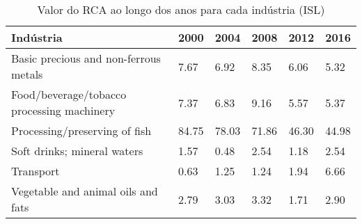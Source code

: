 \begin{table}
\centering
\caption{Valor do RCA ao longo dos anos para cada indústria (ISL)}
\begin{tabular}{p{6cm}p{1.5cm}p{1.5cm}p{1.5cm}p{1.5cm}p{1.5cm}}
\toprule
                                 Indústria &  2000 &  2004 &  2008 &  2012 &  2016 \\
\midrule
     Basic precious and non-ferrous metals &  7.67 &  6.92 &  8.35 &  6.06 &  5.32 \\
Food/beverage/tobacco processing machinery &  7.37 &  6.83 &  9.16 &  5.57 &  5.37 \\
             Processing/preserving of fish & 84.75 & 78.03 & 71.86 & 46.30 & 44.98 \\
               Soft drinks; mineral waters &  1.57 &  0.48 &  2.54 &  1.18 &  2.54 \\
                                 Transport &  0.63 &  1.25 &  1.24 &  1.94 &  6.66 \\
        Vegetable and animal oils and fats &  2.79 &  3.03 &  3.32 &  1.71 &  2.90 \\
\bottomrule
\end{tabular}
\end{table}
